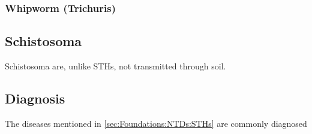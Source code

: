 \subsubsection{Whipworm (Trichuris)}
\label{sec:Foundations:NTDs:STHs:Whipworm}

\subsection{Schistosoma}
\label{sec:Foundations:NTDs:STHs:Schistosoma}

Schistosoma are, unlike \ac{STHs}, not transmitted through soil.  

\subsection{Diagnosis}
\label{sec:Foundations:NTDs:Diagnosis}

The diseases mentioned in \autoref{sec:Foundations:NTDs:STHs} are commonly diagnosed 
